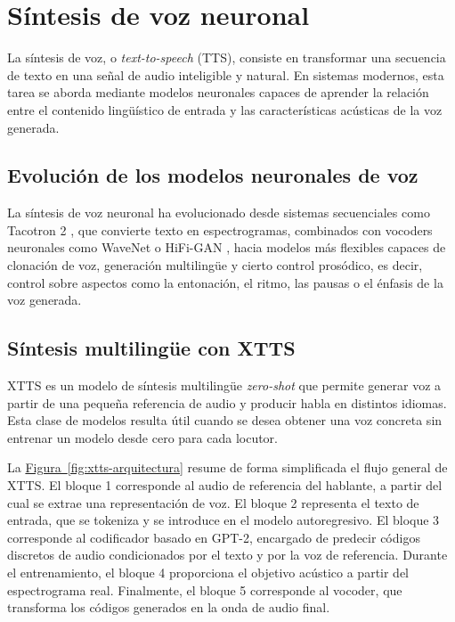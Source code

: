 \section{Síntesis de voz neuronal}
\label{sec:síntesis-voz}


La síntesis de voz, o \textit{text-to-speech} (TTS), consiste en transformar una secuencia de texto en una señal de audio inteligible y natural. En sistemas modernos, esta tarea se aborda mediante modelos neuronales capaces de aprender la relación entre el contenido lingüístico de entrada y las características acústicas de la voz generada.

\subsection{Evolución de los modelos neuronales de voz}

La síntesis de voz neuronal ha evolucionado desde sistemas secuenciales como Tacotron 2 \citep{shen2018tacotron}, que convierte texto en espectrogramas, combinados con vocoders neuronales como WaveNet \citep{oord2016wavenet} o HiFi-GAN \citep{kong2020hifigan}, hacia modelos más flexibles capaces de clonación de voz, generación multilingüe y cierto control prosódico, es decir, control sobre aspectos como la entonación, el ritmo, las pausas o el énfasis de la voz generada.


\subsection{Síntesis multilingüe con XTTS}

XTTS \citep{casanova2024xtts} es un modelo de síntesis multilingüe \textit{zero-shot} que permite generar voz a partir de una pequeña referencia de audio y producir habla en distintos idiomas. Esta clase de modelos resulta útil cuando se desea obtener una voz concreta sin entrenar un modelo desde cero para cada locutor.

La \hyperref[fig:xtts-arquitectura]{Figura~\ref*{fig:xtts-arquitectura}} resume de forma simplificada el flujo general de XTTS. El bloque 1 corresponde al audio de referencia del hablante, a partir del cual se extrae una representación de voz. El bloque 2 representa el texto de entrada, que se tokeniza y se introduce en el modelo autoregresivo. El bloque 3 corresponde al codificador basado en GPT-2, encargado de predecir códigos discretos de audio condicionados por el texto y por la voz de referencia. Durante el entrenamiento, el bloque 4 proporciona el objetivo acústico a partir del espectrograma real. Finalmente, el bloque 5 corresponde al vocoder, que transforma los códigos generados en la onda de audio final.


